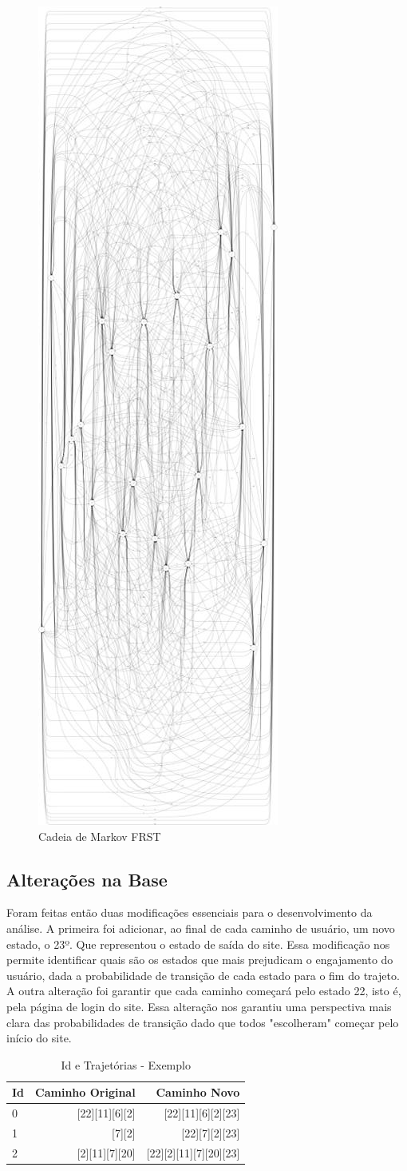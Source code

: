 \begin{figure}[!h]
\graphicspath{{relatorios/grupo3/Imagens/}}
    \centering
    \includegraphics[width=0.25\linewidth, angle=90]{Grafo_FRST.jpeg}
    \caption{Cadeia de Markov FRST}
    \label{fig:enter-label}
\end{figure}

\subsection{Alterações na Base}

Foram feitas então duas modificações essenciais para o desenvolvimento da análise. A primeira foi adicionar, ao final de cada caminho de usuário, um novo estado, o 23º. Que representou o estado de saída do site. Essa modificação nos permite identificar quais são os estados que mais prejudicam o engajamento do usuário, dada a probabilidade de transição de cada estado para o fim do trajeto. A outra alteração foi garantir que cada caminho começará pelo estado 22, isto é, pela página de login do site. Essa alteração nos garantiu uma perspectiva mais clara das probabilidades de transição dado que todos "escolheram" começar pelo início do site.

\begin{table}[h] 
\centering
\begin{tabular}{l r r}
\hline
Id & Caminho Original & Caminho Novo\\
\hline
0 & [22][11][6][2] & [22][11][6][2][23] \\
1 & [7][2] & [22][7][2][23] \\
2 & [2][11][7][20] & [22][2][11][7][20][23] \\
\hline
\end{tabular}
\caption{Id e Trajetórias - Exemplo} %
\label{tab:IdECaminhoOriginais} %
\end{table}

